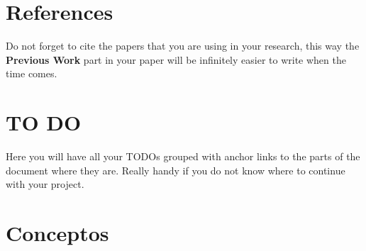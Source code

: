\documentclass[11pt,letterpaper]{article}
\begin{document}
\section{References}
\begin{tip}
Do not forget to cite the papers that you are using in your research, this way the \textbf{Previous Work} part in your paper will be infinitely easier to write when the time comes.
\end{tip}
\nocite{*}


\clearpage
\section{TO DO}
\begin{tip}
Here you will have all your TODOs grouped with anchor links to the parts of the document where they are. Really handy if you do not know where to continue with your project.
\end{tip}
\listoftodos

\newpage

\section{Conceptos}


\begin{multicols}{2}

\end{multicols}
\end{document}
